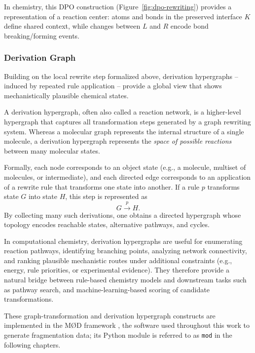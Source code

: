 In chemistry, this DPO construction (Figure~\ref{fig:dpo-rewriting}) provides a representation of a reaction center: atoms and bonds in the preserved interface \(K\) define shared context, while changes between \(L\) and \(R\) encode bond breaking/forming events. \cite[p.~5]{Andersen2017}

\subsubsection{Derivation Graph}
Building on the local rewrite step formalized above, derivation hypergraphs -- induced by repeated rule application -- provide a global view that shows mechanistically plausible chemical states.
\cite[pp.~2--3]{Andersen2013}

A derivation hypergraph, often also called a reaction network, is a higher-level hypergraph that captures all transformation steps generated by a graph rewriting system.
\cite[Sec.~10]{MODDocDGStrat} \cite[p.~2]{Abel2026}
Whereas a molecular graph represents the internal structure of a single molecule, a derivation hypergraph represents the \emph{space of possible reactions} between many molecular states.
\cite[pp.~2--3]{Andersen2013}

Formally, each node corresponds to an object state (e.g., a molecule, multiset of molecules, or intermediate), and each directed edge corresponds to an application of a rewrite rule that transforms one state into another.
 \cite[p.~75]{Echahed2016}
If a rule $p$ transforms state $G$ into state $H$, this step is represented as
\[
G \stackrel{p}{\longrightarrow} H.
\]
By collecting many such derivations, one obtains a directed hypergraph whose topology encodes reachable states, alternative pathways, and cycles.

In computational chemistry, derivation hypergraphs are useful for enumerating reaction pathways, identifying branching points, analyzing network connectivity, and ranking plausible mechanistic routes under additional constraints (e.g., energy, rule priorities, or experimental evidence).
They therefore provide a natural bridge between rule-based chemistry models and downstream tasks such as pathway search, and machine-learning-based scoring of candidate transformations.
\cite[p.~2]{Abel2026}

These graph-transformation and derivation hypergraph constructs are implemented in the M\O D framework \cite{Andersen2017,MODDocDGStrat}, the software used throughout this work to generate fragmentation data; its Python module is referred to as \texttt{mod} in the following chapters.

